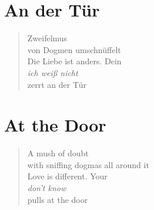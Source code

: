 
\cleartoverso

\section{An der Tür}

\begin{verse}

Zweifelmus\\
von Dogmen umschnüffelt\\
Die Liebe ist anders. Dein\\
\emph{ich weiß nicht}\\
zerrt an der Tür

\end{verse}

\clearpage

\section{At the Door}

\begin{verse}

A mush of doubt\\
with sniffing dogmas all around it\\
Love is different. Your\\
\emph{don't know}\\
pulls at the door

\end{verse}
